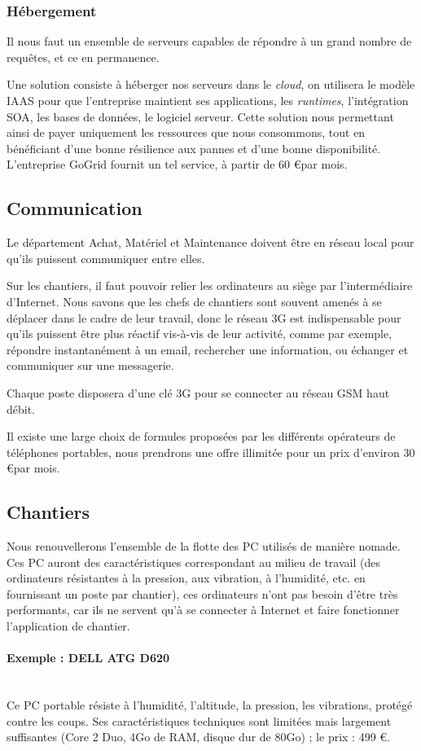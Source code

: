 	\subsubsection{Hébergement}
    Il nous faut un ensemble de serveurs capables de répondre à un grand
    nombre de requêtes, et ce en permanence.

Une solution consiste à héberger nos serveurs dans le \textsl{cloud}, on
utilisera le modèle IAAS pour  que l'entreprise maintient ses applications,
les {\sl runtimes}, l'intégration SOA, les bases de données, le logiciel
serveur.  Cette solution nous permettant ainsi de payer uniquement les
ressources que nous consommons, tout en bénéficiant d'une bonne résilience
aux pannes et d'une bonne disponibilité.  L'entreprise GoGrid fournit un
tel service, à partir de 60 \euro par mois.


\subsection{Communication}
Le département Achat, Matériel et Maintenance doivent être en réseau local
pour qu'ils puissent  communiquer entre elles.

Sur les chantiers, il faut pouvoir relier les ordinateurs au siège par
l'intermédiaire d'Internet.  Nous savons que les chefs de chantiers sont
souvent amenés à se déplacer dans le cadre de leur travail, donc le réseau
3G est indispensable pour qu'ils puissent être plus réactif vis-à-vis de
leur activité, comme par exemple, répondre instantanément à un email,
rechercher une information, ou échanger et communiquer sur une messagerie. 

Chaque poste disposera d’une clé 3G pour se connecter au réseau GSM haut
débit.

Il existe une large choix de formules proposées par les différents
opérateurs de téléphones portables, nous prendrons une offre illimitée pour un prix 
d'environ 30 \euro par mois.

\subsection{Chantiers}

Nous renouvellerons l'ensemble de la flotte des PC utilisés de manière nomade.
Ces PC auront des caractéristiques correspondant au milieu de
travail (des ordinateurs résistantes à la pression, aux vibration, à
l'humidité, etc.  en fournissant un poste par chantier), ces ordinateurs
n'ont pas besoin d’être très performants, car ils ne servent qu'à se
connecter à Internet et faire fonctionner l'application de chantier.

\paragraph{Exemple : DELL ATG D620}\hfill\\
Ce PC portable résiste à l'humidité, l'altitude,
la pression, les vibrations, protégé contre les coups.
Ses caractéristiques techniques sont limitées mais largement suffisantes
(Core 2 Duo, 4Go de RAM, disque dur de 80Go) ; le prix : 499 \euro.
